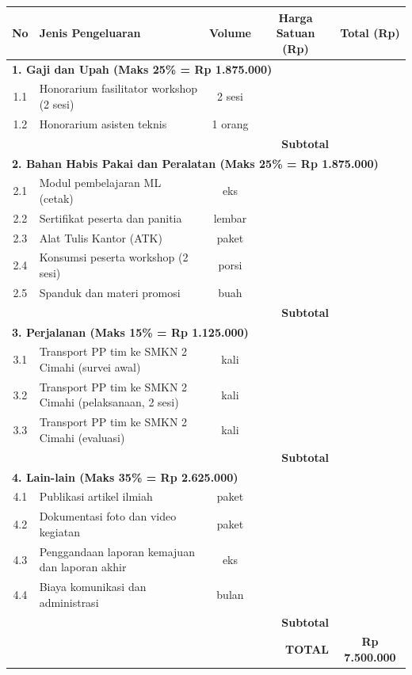 
\begin{table}[h]
    \centering
    \begin{tabularx}{\textwidth}{|c|X|c|c|c|}
        \hline
        \textbf{No} & \textbf{Jenis Pengeluaran} & \textbf{Volume} & \textbf{Harga Satuan (Rp)} & \textbf{Total (Rp)} \\ \hline

        \multicolumn{5}{|l|}{\textbf{1. Gaji dan Upah (Maks 25\% = Rp 1.875.000)}} \\ \hline
        1.1 & Honorarium fasilitator workshop (2 sesi) & 2 sesi & & \\ \hline
        1.2 & Honorarium asisten teknis & 1 orang & & \\ \hline
        \multicolumn{4}{|r|}{\textbf{Subtotal}} & \\ \hline

        \multicolumn{5}{|l|}{\textbf{2. Bahan Habis Pakai dan Peralatan (Maks 25\% = Rp 1.875.000)}} \\ \hline
        2.1 & Modul pembelajaran ML (cetak) & eks & & \\ \hline
        2.2 & Sertifikat peserta dan panitia & lembar & & \\ \hline
        2.3 & Alat Tulis Kantor (ATK) & paket & & \\ \hline
        2.4 & Konsumsi peserta workshop (2 sesi) & porsi & & \\ \hline
        2.5 & Spanduk dan materi promosi & buah & & \\ \hline
        \multicolumn{4}{|r|}{\textbf{Subtotal}} & \\ \hline

        \multicolumn{5}{|l|}{\textbf{3. Perjalanan (Maks 15\% = Rp 1.125.000)}} \\ \hline
        3.1 & Transport PP tim ke SMKN 2 Cimahi (survei awal) & kali & & \\ \hline
        3.2 & Transport PP tim ke SMKN 2 Cimahi (pelaksanaan, 2 sesi) & kali & & \\ \hline
        3.3 & Transport PP tim ke SMKN 2 Cimahi (evaluasi) & kali & & \\ \hline
        \multicolumn{4}{|r|}{\textbf{Subtotal}} & \\ \hline

        \multicolumn{5}{|l|}{\textbf{4. Lain-lain (Maks 35\% = Rp 2.625.000)}} \\ \hline
        4.1 & Publikasi artikel ilmiah & paket & & \\ \hline
        4.2 & Dokumentasi foto dan video kegiatan & paket & & \\ \hline
        4.3 & Penggandaan laporan kemajuan dan laporan akhir & eks & & \\ \hline
        4.4 & Biaya komunikasi dan administrasi & bulan & & \\ \hline
        \multicolumn{4}{|r|}{\textbf{Subtotal}} & \\ \hline

        \multicolumn{4}{|r|}{\textbf{TOTAL}} & \textbf{Rp 7.500.000} \\ \hline
    \end{tabularx}
\end{table}
